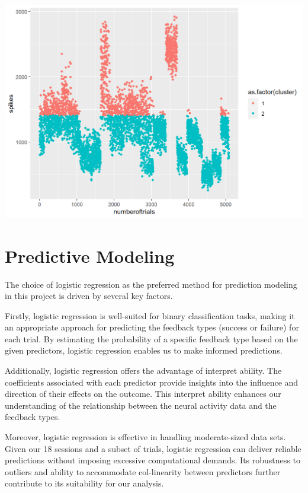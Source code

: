 \documentclass[
]{article}
\begin{document}
\includegraphics{images/unnamed-chunk-12-1.png}

\section{Predictive Modeling}\label{predictive-modeling}

The choice of logistic regression as the preferred method for prediction
modeling in this project is driven by several key factors.

Firstly, logistic regression is well-suited for binary classification
tasks, making it an appropriate approach for predicting the feedback
types (success or failure) for each trial. By estimating the probability
of a specific feedback type based on the given predictors, logistic
regression enables us to make informed predictions.

Additionally, logistic regression offers the advantage of interpret
ability. The coefficients associated with each predictor provide
insights into the influence and direction of their effects on the
outcome. This interpret ability enhances our understanding of the
relationship between the neural activity data and the feedback types.

Moreover, logistic regression is effective in handling moderate-sized
data sets. Given our 18 sessions and a subset of trials, logistic
regression can deliver reliable predictions without imposing excessive
computational demands. Its robustness to outliers and ability to
accommodate col-linearity between predictors further contribute to its
suitability for our analysis.
\end{document}
